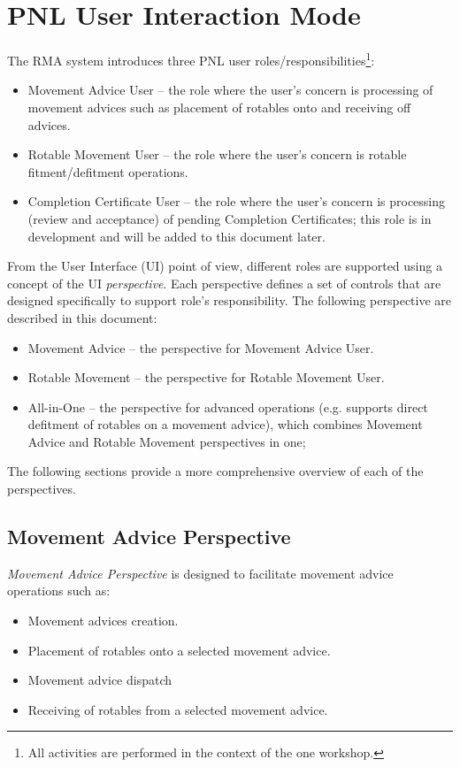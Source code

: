 \section{PNL User Interaction Mode}

The RMA system introduces three PNL user roles/responsibilities\footnote{All activities are performed in the context of the one workshop.}:

\begin{itemize}
	\item Movement Advice User -- the role where the user's concern is processing of movement advices such as placement of rotables onto and receiving off advices.
	\item Rotable Movement User -- the role where the user's concern is rotable fitment/defitment operations.
	\item Completion Certificate User -- the role where the user's concern is processing (review and acceptance) of pending Completion Certificates; this role is in development and will be added to this document later.
\end{itemize}

From the User Interface (UI) point of view, different roles are supported using a concept of the UI \emph{perspective}. Each perspective defines a set of controls that are designed specifically to support role's responsibility. The following perspective are described in this document:
\begin{itemize}
	\item Movement Advice -- the perspective for Movement Advice User.
	\item Rotable Movement -- the perspective for Rotable Movement User.
	\item All-in-One -- the perspective for advanced operations (e.g. supports direct defitment of rotables on a movement advice), which combines Movement Advice and Rotable Movement perspectives in one; 
\end{itemize}

The following sections provide a more comprehensive overview of each of the perspectives.
\clearpage

\subsection{Movement Advice Perspective}

\emph{Movement Advice Perspective} is designed to facilitate movement advice operations such as:
\begin{itemize}
  \item Movement advices creation.
  \item Placement of rotables onto a selected movement advice.
  \item Movement advice dispatch
  \item Receiving of rotables from a selected movement advice.
\end{itemize}

